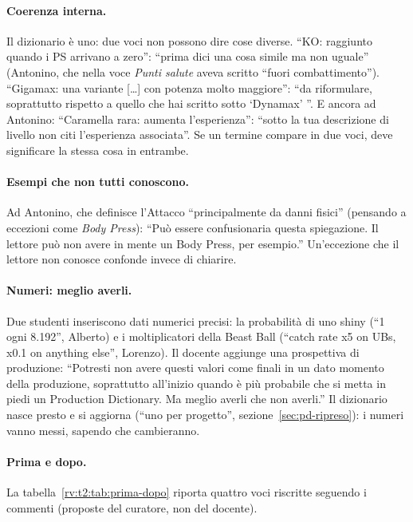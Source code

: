 \paragraph{Coerenza interna.} Il dizionario è uno: due voci non possono dire
cose diverse. ``KO: raggiunto quando i PS arrivano a zero'': ``prima dici una
cosa simile ma non uguale'' (Antonino, che nella voce \emph{Punti salute}
aveva scritto ``fuori combattimento''). ``Gigamax: una variante [\dots] con
potenza molto maggiore'': ``da riformulare, soprattutto rispetto a quello che
hai scritto sotto `Dynamax' ''. E ancora ad Antonino: ``Caramella rara:
aumenta l'esperienza'': ``sotto la tua descrizione di livello non citi
l'esperienza associata''. Se un termine compare in due voci, deve significare
la stessa cosa in entrambe.

\paragraph{Esempi che non tutti conoscono.} Ad Antonino, che definisce
l'Attacco ``principalmente da danni fisici'' (pensando a eccezioni come
\emph{Body Press}): ``Può essere confusionaria questa spiegazione. Il lettore
può non avere in mente un Body Press, per esempio.'' Un'eccezione che il
lettore non conosce confonde invece di chiarire.

\paragraph{Numeri: meglio averli.} Due studenti inseriscono dati numerici
precisi: la probabilità di uno shiny (``1 ogni 8.192'', Alberto) e i
moltiplicatori della Beast Ball (``catch rate x5 on UBs, x0.1 on anything
else'', Lorenzo). Il docente aggiunge una prospettiva di produzione: ``Potresti
non avere questi valori come finali in un dato momento della produzione,
soprattutto all'inizio quando è più probabile che si metta in piedi un
Production Dictionary. Ma meglio averli che non averli.'' Il dizionario nasce
presto e si aggiorna (``uno per progetto'', sezione~\ref{sec:pd-ripreso}): i
numeri vanno messi, sapendo che cambieranno.

\paragraph{Prima e dopo.} La tabella~\ref{rv:t2:tab:prima-dopo} riporta
quattro voci riscritte seguendo i commenti (proposte del curatore, non del
docente).

